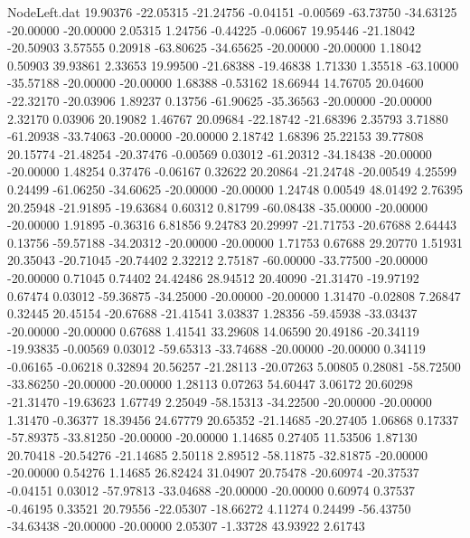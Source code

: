 \begin{filecontents}{NodeLeft.dat}
  19.90376  -22.05315  -21.24756    -0.04151   -0.00569  -63.73750  -34.63125  -20.00000  -20.00000    2.05315    1.24756   -0.44225   -0.06067
  19.95446  -21.18042  -20.50903     3.57555    0.20918  -63.80625  -34.65625  -20.00000  -20.00000    1.18042    0.50903   39.93861    2.33653
  19.99500  -21.68388  -19.46838     1.71330    1.35518  -63.10000  -35.57188  -20.00000  -20.00000    1.68388   -0.53162   18.66944   14.76705
  20.04600  -22.32170  -20.03906     1.89237    0.13756  -61.90625  -35.36563  -20.00000  -20.00000    2.32170    0.03906   20.19082    1.46767
  20.09684  -22.18742  -21.68396     2.35793    3.71880  -61.20938  -33.74063  -20.00000  -20.00000    2.18742    1.68396   25.22153   39.77808
  20.15774  -21.48254  -20.37476    -0.00569    0.03012  -61.20312  -34.18438  -20.00000  -20.00000    1.48254    0.37476   -0.06167    0.32622
  20.20864  -21.24748  -20.00549     4.25599    0.24499  -61.06250  -34.60625  -20.00000  -20.00000    1.24748    0.00549   48.01492    2.76395
  20.25948  -21.91895  -19.63684     0.60312    0.81799  -60.08438  -35.00000  -20.00000  -20.00000    1.91895   -0.36316    6.81856    9.24783
  20.29997  -21.71753  -20.67688     2.64443    0.13756  -59.57188  -34.20312  -20.00000  -20.00000    1.71753    0.67688   29.20770    1.51931
  20.35043  -20.71045  -20.74402     2.32212    2.75187  -60.00000  -33.77500  -20.00000  -20.00000    0.71045    0.74402   24.42486   28.94512
  20.40090  -21.31470  -19.97192     0.67474    0.03012  -59.36875  -34.25000  -20.00000  -20.00000    1.31470   -0.02808    7.26847    0.32445
  20.45154  -20.67688  -21.41541     3.03837    1.28356  -59.45938  -33.03437  -20.00000  -20.00000    0.67688    1.41541   33.29608   14.06590
  20.49186  -20.34119  -19.93835    -0.00569    0.03012  -59.65313  -33.74688  -20.00000  -20.00000    0.34119   -0.06165   -0.06218    0.32894
  20.56257  -21.28113  -20.07263     5.00805    0.28081  -58.72500  -33.86250  -20.00000  -20.00000    1.28113    0.07263   54.60447    3.06172
  20.60298  -21.31470  -19.63623     1.67749    2.25049  -58.15313  -34.22500  -20.00000  -20.00000    1.31470   -0.36377   18.39456   24.67779
  20.65352  -21.14685  -20.27405     1.06868    0.17337  -57.89375  -33.81250  -20.00000  -20.00000    1.14685    0.27405   11.53506    1.87130
  20.70418  -20.54276  -21.14685     2.50118    2.89512  -58.11875  -32.81875  -20.00000  -20.00000    0.54276    1.14685   26.82424   31.04907
  20.75478  -20.60974  -20.37537    -0.04151    0.03012  -57.97813  -33.04688  -20.00000  -20.00000    0.60974    0.37537   -0.46195    0.33521
  20.79556  -22.05307  -18.66272     4.11274    0.24499  -56.43750  -34.63438  -20.00000  -20.00000    2.05307   -1.33728   43.93922    2.61743

\end{filecontents}
